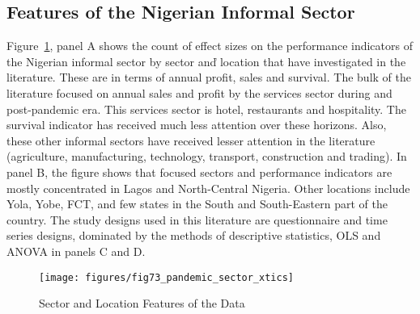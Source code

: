 \documentclass[12pt, english]{article}
\begin{document}
    \subsection{Features of the Nigerian Informal Sector}\label{subsec4.1:features-of-the-informal-sector}
    Figure~\ref{fig2:pandemic-sector-xtics}, panel A shows the count of effect sizes on the performance indicators of the Nigerian informal sector by sector anď location that have investigated in the literature. These are in terms of annual profit, sales and survival. The bulk of the literature focused on annual sales and profit by the services sector during and post-pandemic era. This services sector is hotel, restaurants and hospitality. The survival indicator has received much less attention over these horizons. Also, these other informal sectors have received lesser attention in the literature (agriculture, manufacturing, technology, transport, construction and trading). In panel B, the figure shows that focused sectors and performance indicators are mostly concentrated in Lagos and North-Central Nigeria. Other locations include Yola, Yobe, FCT, and few states in the South and South-Eastern part of the country. The study designs used in this literature are questionnaire and time series designs, dominated by the methods of descriptive statistics, OLS and ANOVA in panels C and D.

    \begin{figure}[H]
        \centering
        \texttt{[image: figures/fig73\_pandemic\_sector\_xtics]}
        \caption{Sector and Location Features of the Data}
        \label{fig2:pandemic-sector-xtics}
    \end{figure}
%
\end{document}

